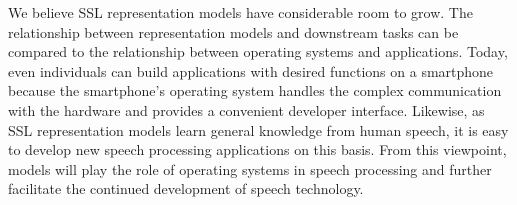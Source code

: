We believe SSL representation models have considerable room to grow. The relationship between representation models and downstream tasks can be compared to the relationship between operating systems and applications. Today, even individuals can build applications with desired functions on a smartphone because the smartphone's operating system handles the complex communication with the hardware and provides a convenient developer interface. Likewise, as SSL representation models learn general knowledge from human speech, it is easy to develop new speech processing applications on this basis. From this viewpoint,  models will play the role of operating systems in speech processing and further facilitate the continued development of speech technology. 
